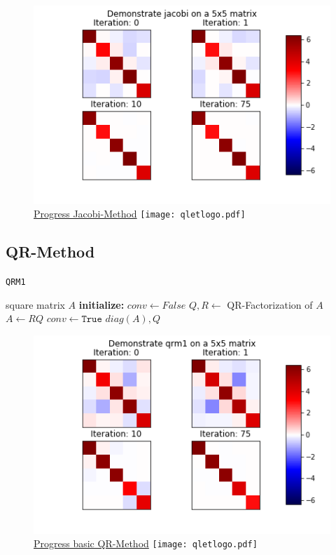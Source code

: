 \documentclass[12pt]{article}
\begin{document}
\begin{figure}
\begin{center}
\caption{\href {https://github.com/thsis/NIS18/tree/master/media/plots}{Progress Jacobi-Method}  \protect\texttt{[image: qletlogo.pdf]}}
  \includegraphics[scale=0.6]{../media/plots/jacobi.png}
\end{center}
\end{figure}


\subsection{QR-Method}

\begin{algorithm}[H]
\caption{\texttt{QRM1}}
\label{qr1-meth}
  \begin{algorithmic}
    \Require square matrix $A$
    \Statex \textbf{initialize: } $conv \gets False$
      \State $Q, R \gets$ QR-Factorization of $A$
      \State $A \gets RQ$
        \State $conv \gets \texttt{True}$
        \Statex
      \EndIf
    \EndWhile
    \Return $diag\left(A\right), Q$
  \end{algorithmic}
\end{algorithm}

\begin{figure}
\begin{center}
\caption{\href {https://github.com/thsis/NIS18/tree/master/media/plots}{Progress basic QR-Method}  \protect\texttt{[image: qletlogo.pdf]}}
  \includegraphics[scale=0.6]{../media/plots/qrm1.png}
\end{center}
\end{figure}
\end{document}
